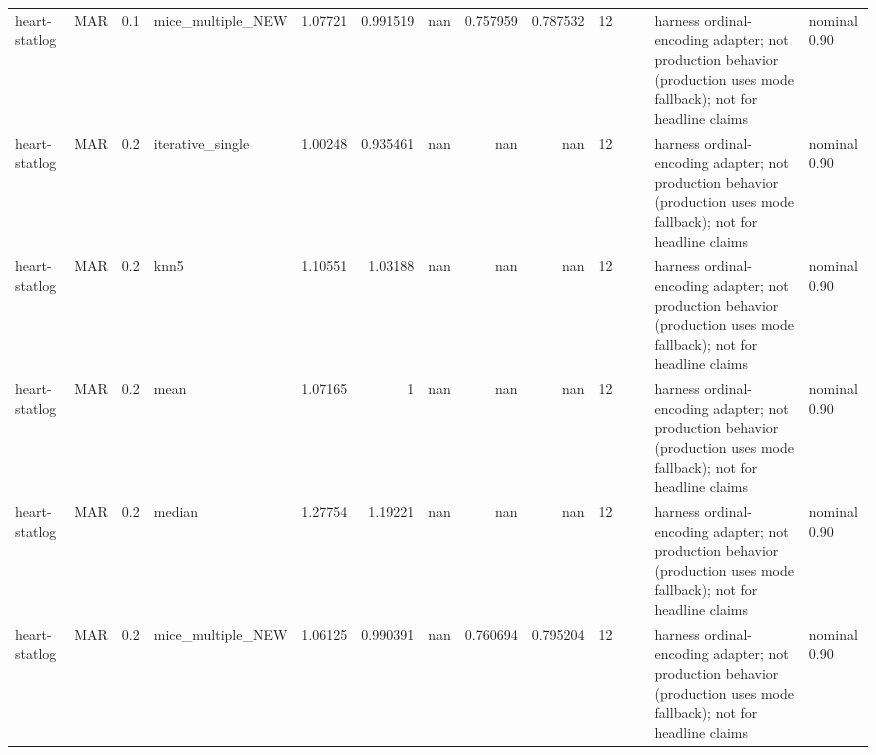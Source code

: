 \begin{table}[ht]
\begin{tabular}{llrlrrrrrrllll}
 heart-statlog        & MAR         &         0.1 & mice\_multiple\_NEW &       1.07721  &             0.991519 &               nan        &                       0.757959 &                         0.787532 &        12 &                    &                                         & harness ordinal-encoding adapter; not production behavior (production uses mode fallback); not for headline claims & nominal 0.90              \\
 heart-statlog        & MAR         &         0.2 & iterative\_single  &       1.00248  &             0.935461 &               nan        &                     nan        &                       nan        &        12 &                    &                                         & harness ordinal-encoding adapter; not production behavior (production uses mode fallback); not for headline claims & nominal 0.90              \\
 heart-statlog        & MAR         &         0.2 & knn5              &       1.10551  &             1.03188  &               nan        &                     nan        &                       nan        &        12 &                    &                                         & harness ordinal-encoding adapter; not production behavior (production uses mode fallback); not for headline claims & nominal 0.90              \\
 heart-statlog        & MAR         &         0.2 & mean              &       1.07165  &             1        &               nan        &                     nan        &                       nan        &        12 &                    &                                         & harness ordinal-encoding adapter; not production behavior (production uses mode fallback); not for headline claims & nominal 0.90              \\
 heart-statlog        & MAR         &         0.2 & median            &       1.27754  &             1.19221  &               nan        &                     nan        &                       nan        &        12 &                    &                                         & harness ordinal-encoding adapter; not production behavior (production uses mode fallback); not for headline claims & nominal 0.90              \\
 heart-statlog        & MAR         &         0.2 & mice\_multiple\_NEW &       1.06125  &             0.990391 &               nan        &                       0.760694 &                         0.795204 &        12 &                    &                                         & harness ordinal-encoding adapter; not production behavior (production uses mode fallback); not for headline claims & nominal 0.90              \\

\end{tabular}
\end{table}
